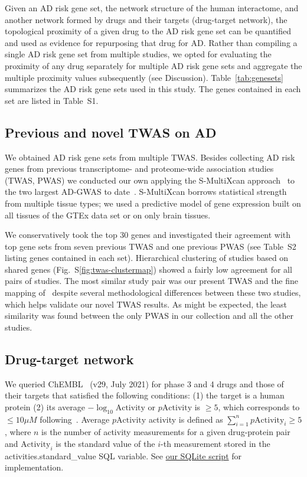 \documentclass[letterpaper]{article}
\begin{document}
Given an AD risk gene set, the network structure of the human interactome, and
another network formed by drugs and their targets (drug-target network), the
topological proximity of a given drug to the AD risk gene set can be
quantified\citep{Guney2016} and used as evidence for repurposing that drug for
AD.  Rather than compiling a single AD risk gene set from multiple studies, we
opted for evaluating the proximity of any drug separately for multiple AD risk gene
sets and aggregate the multiple proximity values subsequently (see
Discussion).  Table~\ref{tab:genesets} summarizes the AD risk gene sets used in
this study.  The genes contained in each set are listed in Table~S1.

\subsection{Previous and novel TWAS on AD}

We obtained AD risk gene sets from multiple TWAS.  Besides collecting AD risk genes from
previous transcriptome- and proteome-wide association studies (TWAS, PWAS) we
conducted our own applying the S-MultiXcan approach~\citep{Barbeira2018} to
the two largest AD-GWAS to date~\citep{Schwartzentruber2021,Wightman2021}.
S-MultiXcan borrows statistical strength from multiple tissue types; we used a
predictive model of gene expression built on all tissues of the GTEx data set
or on only brain tissues.

We conservatively took the top 30 genes and investigated their agreement with
top gene sets from seven previous TWAS and one previous PWAS (see Table~S2
listing genes contained in each set).  Hierarchical clustering of studies
based on shared genes (Fig.~S\ref{fig:twas-clustermap}) showed a fairly low
agreement for all pairs of studies.  The most similar study pair was our
present TWAS and the fine mapping of~\cite{Jansen2019} despite several
methodological differences between these two studies, which helps validate our
novel TWAS results.  As might be expected, the least similarity was found
between the only PWAS in our collection and all the other studies.

\subsection{Drug-target network}

We queried ChEMBL~\citep{Gaulton2017} (v29, July 2021) for phase 3 and 4 drugs
and those of their targets that satisfied the following conditions: (1) the
target is a human protein (2) its average $-\log_{10}\mathrm{Activity}$ or
$p\mathrm{Activity}$ is $\ge 5$, which corresponds to $\le 10 \mu M$
following~\cite{Cheng2018}.  Average $p\mathrm{Activity}$ activity is defined
as $\sum_{i=1}^n p\mathrm{Activity}_i \ge 5$, where $n$ is the number of
activity measurements for a given drug-protein pair and $\mathrm{Activity}_i$
is the standard value of the $i$-th measurement stored in the
activities.standard\_value SQL variable.  See
\href{https://github.com/attilagk/CTNS-notebook/blob/main/2021-10-24-chembl-query/drug_target_avg_activity.sql}{our SQLite script} for implementation.
\end{document}
